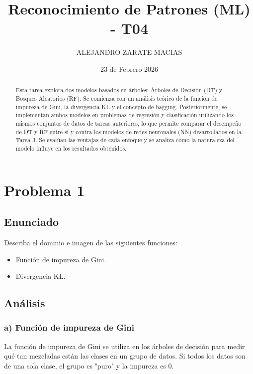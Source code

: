 \documentclass{article}
\title{Reconocimiento de Patrones (ML) - T04}
\author{ALEJANDRO ZARATE MACIAS}
\date{23 de Febrero 2026}
\begin{document}
\maketitle

\begin{abstract}
Esta tarea explora dos modelos basados en árboles: Árboles de Decisión (DT) y Bosques Aleatorios (RF). Se comienza con un análisis teórico de la función de impureza de Gini, la divergencia KL y el concepto de bagging. Posteriormente, se implementan ambos modelos en problemas de regresión y clasificación utilizando los mismos conjuntos de datos de tareas anteriores, lo que permite comparar el desempeño de DT y RF entre sí y contra los modelos de redes neuronales (NN) desarrollados en la Tarea 3. Se evalúan las ventajas de cada enfoque y se analiza cómo la naturaleza del modelo influye en los resultados obtenidos.
\end{abstract}


\section{Problema 1}

\subsection{Enunciado}

Describa el dominio e imagen de las siguientes funciones:
\begin{itemize}
    \item [a)] Función de impureza de Gini.
    \item [b)] Divergencia KL.
\end{itemize}

\subsection{Análisis}

\subsubsection{a) Función de impureza de Gini}

La función de impureza de Gini se utiliza en los árboles de decisión para medir qué tan mezcladas están las clases en un grupo de datos. Si todos los datos son de una sola clase, el grupo es "puro" y la impureza es 0.
\end{document}
